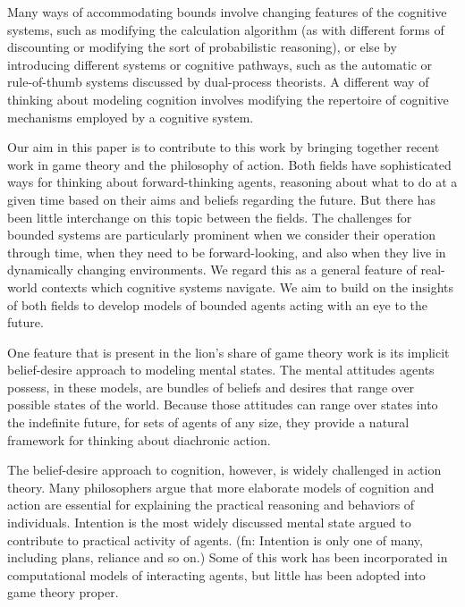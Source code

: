 \documentclass[
11pt,
titlepage,
reqno,
]{article}%
\theoremstyle{definition}
\begin{document}
Many ways of accommodating bounds involve changing features of the cognitive systems, such as modifying the calculation algorithm (as with different forms of discounting or modifying the sort of probabilistic reasoning), or else by introducing different systems or cognitive pathways, such as the automatic or rule-of-thumb systems discussed by dual-process theorists.
A different way of thinking about modeling cognition involves modifying the repertoire of cognitive mechanisms employed by a cognitive system.

Our aim in this paper is to contribute to this work by bringing together recent work in game theory and the philosophy of action. 
Both fields have sophisticated ways for thinking about forward-thinking agents, reasoning about what to do at a given time based on their aims and beliefs regarding the future. 
But there has been little interchange on this topic between the fields. 
The challenges for bounded systems are particularly prominent when we consider their operation through time, when they need to be forward-looking, and also when they live in dynamically changing environments. We regard this as a general feature of real-world contexts which cognitive systems navigate.
We aim to build on the insights of both fields to develop models of bounded agents acting with an eye to the future.

One feature that is present in the lion's share of game theory work is its implicit belief-desire approach to modeling mental states. 
The mental attitudes agents possess, in these models, are bundles of beliefs and desires that range over possible states of the world. 
Because those attitudes can range over states into the indefinite future, for sets of agents of any size, they provide a natural framework for thinking about diachronic action.

The belief-desire approach to cognition, however, is widely challenged in action theory. 
Many philosophers argue that more elaborate models of cognition and action are essential for explaining the practical reasoning and behaviors of individuals. 
Intention is the most widely discussed mental state argued to contribute to practical activity of agents. 
(fn: Intention is only one of many, including plans, reliance and so on.) 
Some of this work has been incorporated in computational models of interacting agents, but little has been adopted into game theory proper. 
\end{document}
